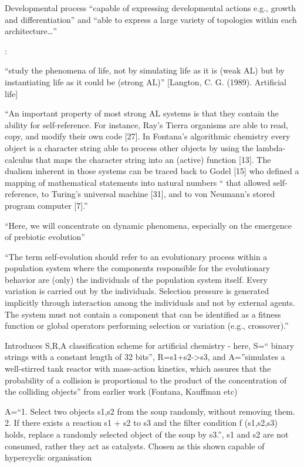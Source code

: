 			
			Developmental process ``capable of expressing developmental actions
			e.g., growth and differentiation'' and ``able to express a large
			variety of topologies within each architecture\ldots{}''

		
\autocite{Dittrich1998}:


			``study the phenomena of life, not by simulating life as it is (weak
			AL) but by instantiating life as it could be (strong AL)'' {[}Langton,
			C. G. (1989). Artificial life{]}
			

			
			``An important property of most strong AL systems is that they contain
			the ability for self-reference. For instance, Ray's Tierra organisms
			are able to read, copy, and modify their own code {[}27{]}. In
			Fontana's algorithmic chemistry every object is a character string
			able to process other objects by using the lambda-calculus that maps
			the character string into an (active) function {[}13{]}. The dualism
			inherent in those systems can be traced back to Godel {[}15{]} who
			defined a mapping of mathematical statements into natural numbers ``
			that allowed self-reference, to Turing's universal machine {[}31{]},
			and to von Neumann's stored program computer {[}7{]}.''

			
			``Here, we will concentrate on dynamic phenomena, especially on the
			emergence of prebiotic evolution''
	

			``The term self-evolution should refer to an evolutionary process
			within a population system where the components responsible for the
			evolutionary behavior are (only) the individuals of the population
			system itself. Every variation is carried out by the individuals.
			Selection pressure is generated implicitly through interaction among
			the individuals and not by external agents. The system must not
			contain a component that can be identified as a fitness function or
			global operators performing selection or variation (e.g.,
			crossover).''
			
			Introduces S,R,A classification scheme for artificial chemistry -
			here, S=`` binary strings with a constant length of 32 bits'',
			R=s1+s2-\textgreater{}s3, and A=''simulates a well-stirred tank
			reactor with mass-action kinetics, which assures that the probability
			of a collision is proportional to the product of the concentration of
			the colliding objects'' from earlier work (Fontana, Kauffman etc)
			

			A=``1. Select two objects s1,s2 from the soup randomly, without
			removing them. 2. If there exists a reaction s1 + s2 to s3 and the
			filter condition f (s1,s2,s3) holds, replace a randomly selected
			object of the soup by s3.'', s1 and s2 are not consumed, rather they
			act as catalysts. Chosen as this shown capable of hypercyclic
			organisation
			

